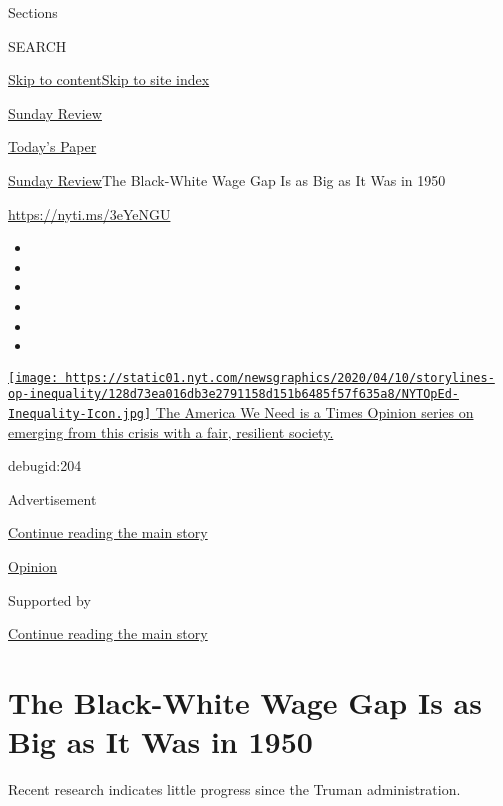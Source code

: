 Sections

SEARCH

\protect\hyperlink{site-content}{Skip to
content}\protect\hyperlink{site-index}{Skip to site index}

\href{https://www.nytimes.com/section/opinion/sunday}{Sunday Review}

\href{https://myaccount.nytimes.com/auth/login?response_type=cookie\&client_id=vi}{}

\href{https://www.nytimes.com/section/todayspaper}{Today's Paper}

\href{/section/opinion/sunday}{Sunday Review}\textbar{}The Black-White
Wage Gap Is as Big as It Was in 1950

\href{https://nyti.ms/3eYeNGU}{https://nyti.ms/3eYeNGU}

\begin{itemize}
\item
\item
\item
\item
\item
\item
\end{itemize}

\href{https://www.nytimes.com/interactive/2020/opinion/america-inequality-coronavirus.html?action=click\&pgtype=Article\&state=default\&region=TOP_BANNER\&context=storylines_menu}{\texttt{[image: https://static01.nyt.com/newsgraphics/2020/04/10/storylines-op-inequality/128d73ea016db3e2791158d151b6485f57f635a8/NYTOpEd-Inequality-Icon.jpg]}
The America We Need is a Times Opinion series on emerging from this
crisis with a fair, resilient society. }

debugid:204

Advertisement

\protect\hyperlink{after-top}{Continue reading the main story}

\href{/section/opinion}{Opinion}

Supported by

\protect\hyperlink{after-sponsor}{Continue reading the main story}

\hypertarget{the-black-white-wage-gap-is-as-big-as-it-was-in-1950}{%
\section{The Black-White Wage Gap Is as Big as It Was in
1950}\label{the-black-white-wage-gap-is-as-big-as-it-was-in-1950}}

Recent research indicates little progress since the Truman
administration.


